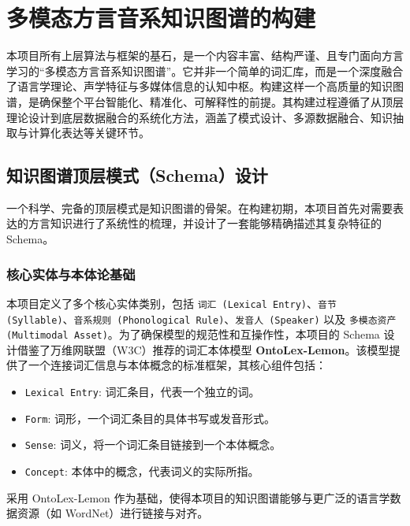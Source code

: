 \chapter{多模态方言音系知识图谱的构建}

本项目所有上层算法与框架的基石，是一个内容丰富、结构严谨、且专门面向方言学习的“多模态方言音系知识图谱”。它并非一个简单的词汇库，而是一个深度融合了语言学理论、声学特征与多媒体信息的认知中枢。构建这样一个高质量的知识图谱，是确保整个平台智能化、精准化、可解释性的前提。其构建过程遵循了从顶层理论设计到底层数据融合的系统化方法，涵盖了模式设计、多源数据融合、知识抽取与计算化表达等关键环节。

\section{知识图谱顶层模式（Schema）设计}
一个科学、完备的顶层模式是知识图谱的骨架。在构建初期，本项目首先对需要表达的方言知识进行了系统性的梳理，并设计了一套能够精确描述其复杂特征的Schema。

\subsection{核心实体与本体论基础}
本项目定义了多个核心实体类别，包括 \texttt{词汇 (Lexical Entry)}、\texttt{音节 (Syllable)}、\texttt{音系规则 (Phonological Rule)}、\texttt{发音人 (Speaker)} 以及 \texttt{多模态资产 (Multimodal Asset)}。为了确保模型的规范性和互操作性，本项目的 Schema 设计借鉴了万维网联盟（W3C）推荐的词汇本体模型 \textbf{OntoLex-Lemon}。该模型提供了一个连接词汇信息与本体概念的标准框架，其核心组件包括：
\begin{itemize}
    \item \texttt{Lexical Entry}: 词汇条目，代表一个独立的词。
    \item \texttt{Form}: 词形，一个词汇条目的具体书写或发音形式。
    \item \texttt{Sense}: 词义，将一个词汇条目链接到一个本体概念。
    \item \texttt{Concept}: 本体中的概念，代表词义的实际所指。
\end{itemize}
采用 OntoLex-Lemon 作为基础，使得本项目的知识图谱能够与更广泛的语言学数据资源（如 WordNet）进行链接与对齐。

